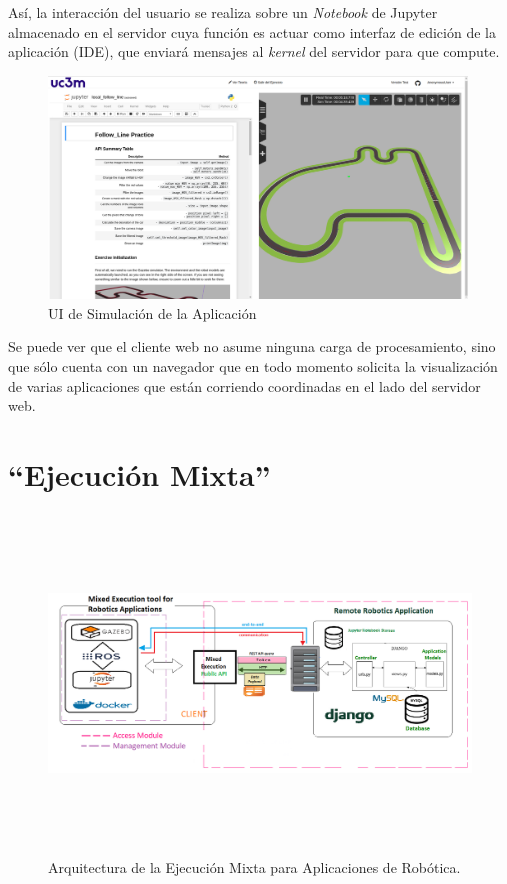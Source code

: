 Así, la interacción del usuario se realiza sobre un \textit{Notebook} de Jupyter almacenado en el servidor cuya función es actuar como interfaz de edición de la aplicación (IDE), que enviará mensajes al \textit{kernel} del servidor para que compute.

\begin{figure}[!hbtp]  \centering\noindent
    \includegraphics[width=0.99\textwidth]{figures/ui_simulation.png}
    \caption{UI de Simulación de la Aplicación}
    \label{simui}
\end{figure}

Se puede ver que el cliente web no asume ninguna carga de procesamiento, sino que sólo cuenta con un navegador que en todo momento solicita la visualización de varias aplicaciones que están corriendo coordinadas en el lado del servidor web.

\section{``Ejecución Mixta''}

\begin{figure}[!ht]  \centering\noindent
    \includegraphics[width=1.20\textwidth,height=9cm]{figures/ejecucion-mixta-infograma.png}
    \caption{Arquitectura de la Ejecución Mixta para Aplicaciones de Robótica.}
    \label{mixedexecarch}
\end{figure}

